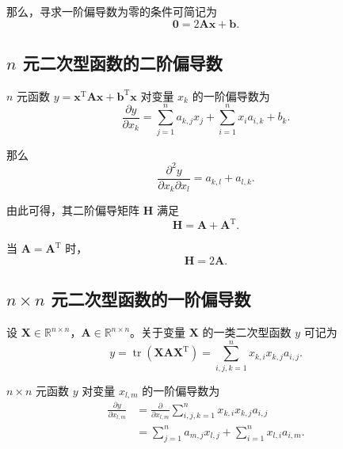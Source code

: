 那么，寻求一阶偏导数为零的条件可简记为
\begin{equation*}
\boldsymbol{0} = 2 \boldsymbol{A} \boldsymbol{x} + \boldsymbol{b}.
\end{equation*}

\subsection{$n$ 元二次型函数的二阶偏导数}

$n$ 元函数 $y = \boldsymbol{x}^{\mathrm{T}} \boldsymbol{A} \boldsymbol{x} + \boldsymbol{b}^{\mathrm{T}} \boldsymbol{x}$ 对变量 $x_k$ 的一阶偏导数为
\begin{equation*}
\frac{\partial y}{\partial x_k} = \sum_{j=1}^{n} a_{k,j} x_j + \sum_{i=1}^{n} x_i a_{i,k} + b_k.
\end{equation*}

那么
\begin{equation*}
\frac{\partial^2 y}{\partial x_k \partial x_l} = a_{k,l} + a_{l,k}.
\end{equation*}

由此可得，其二阶偏导矩阵 $\boldsymbol{H}$ 满足
\begin{equation*}
\boldsymbol{H} = \boldsymbol{A} + \boldsymbol{A}^{\mathrm{T}}.
\end{equation*}

当 $\boldsymbol{A} = \boldsymbol{A}^{\mathrm{T}}$ 时，
\begin{equation*}
\boldsymbol{H} = 2 \boldsymbol{A}.
\end{equation*}

\subsection{$n \times n$ 元二次型函数的一阶偏导数}

设 $\boldsymbol{X} \in \mathbb{R}^{n \times n}$，$\boldsymbol{A} \in \mathbb{R}^{n \times n}$。关于变量 $\boldsymbol{X}$ 的一类二次型函数 $y$ 可记为
\begin{equation*}
y = \operatorname{tr} \left( \boldsymbol{X} \boldsymbol{A} \boldsymbol{X}^{\mathrm{T}} \right) = \sum_{i,j,k=1}^{n} x_{k,i} x_{k,j} a_{i,j}.
\end{equation*}

$n \times n$ 元函数 $y$ 对变量 $x_{l,m}$ 的一阶偏导数为
\begin{equation*}
\begin{aligned}
\frac{\partial y}{\partial x_{l,m}}
&= \frac{\partial}{\partial x_{l,m}} \sum_{i,j,k=1}^{n} x_{k,i} x_{k,j} a_{i,j} \\
&= \sum_{j=1}^{n} a_{m,j} x_{l,j} + \sum_{i=1}^{n} x_{l,i} a_{i,m}.
\end{aligned}
\end{equation*}


